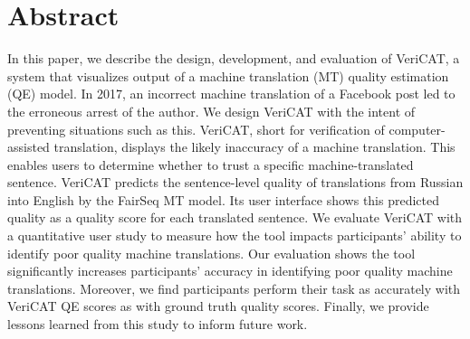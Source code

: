 \section{Abstract}


In this paper, we describe the design, development, and evaluation of VeriCAT, a system that visualizes output of a machine translation (MT) quality estimation (QE) model. In 2017, an incorrect machine translation of a Facebook post led to the erroneous arrest of the author. We design VeriCAT with the intent of preventing situations such as this. VeriCAT, short for verification of computer-assisted translation, displays the likely inaccuracy of a machine translation. This enables users to determine whether to trust a specific machine-translated sentence. VeriCAT predicts the sentence-level quality of translations from Russian into English by the FairSeq MT model. Its user interface shows this predicted quality as a quality score for each translated sentence. We evaluate VeriCAT with a quantitative user study to measure how the tool impacts participants’ ability to identify poor quality machine translations. Our evaluation shows the tool significantly increases participants' accuracy in identifying poor quality machine translations. Moreover, we find participants perform their task as accurately with VeriCAT QE scores as with ground truth quality scores. Finally, we provide lessons learned from this study to inform future work.  

